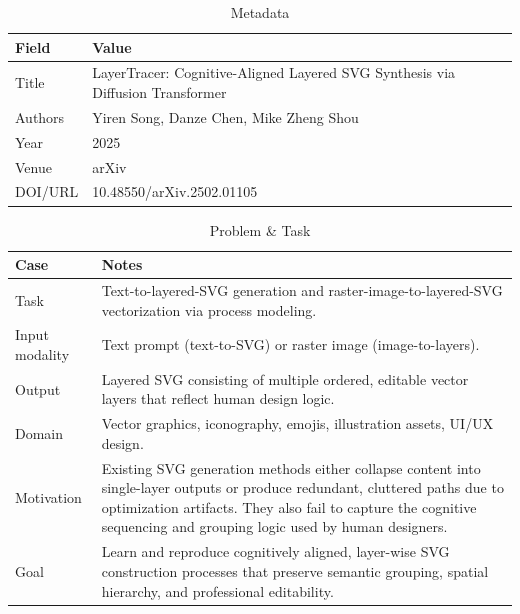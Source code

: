 \newpage

\begin{table}[h!]
\centering
\caption{Metadata}
\begin{tabular}{|l|l|}
\hline
\textbf{Field} & \textbf{Value} \\ \hline
Title & LayerTracer: Cognitive-Aligned Layered SVG Synthesis via Diffusion Transformer \\ \hline
Authors & Yiren Song, Danze Chen, Mike Zheng Shou \\ \hline
Year & 2025 \\ \hline
Venue & arXiv \\ \hline
DOI/URL & 10.48550/arXiv.2502.01105 \\ \hline
\end{tabular}
\end{table}

\begin{table}[h!]
\centering
\caption{Problem \& Task}
\begin{tabular}{|l|p{10cm}|}
\hline
\textbf{Case} & \textbf{Notes} \\ \hline
Task &
Text-to-layered-SVG generation and raster-image-to-layered-SVG vectorization via process modeling. \\ \hline
Input modality &
Text prompt (text-to-SVG) or raster image (image-to-layers). \\ \hline
Output &
Layered SVG consisting of multiple ordered, editable vector layers that reflect human design logic. \\ \hline
Domain &
Vector graphics, iconography, emojis, illustration assets, UI/UX design. \\ \hline
Motivation &
Existing SVG generation methods either collapse content into single-layer outputs or produce redundant, cluttered paths due to optimization artifacts. They also fail to capture the cognitive sequencing and grouping logic used by human designers. \\ \hline
Goal &
Learn and reproduce cognitively aligned, layer-wise SVG construction processes that preserve semantic grouping, spatial hierarchy, and professional editability. \\ \hline
\end{tabular}
\end{table}

